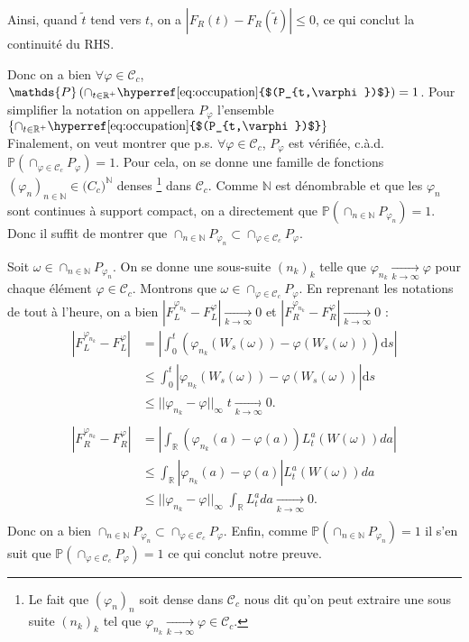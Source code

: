 \documentclass[openany]{book}
\makeatletter
\renewcommand{\P}{\mathds{P}}
\newcommand{\R}{\mathbb{R}}
\newcommand{\1}{\mathbbm{1}}
\newcommand{\refocc}{\hyperref[eq:occupation]{$(P_{t,\varphi})$}}
\renewcommand{\d}{\mathrm{d}}
\renewenvironment{proof}[1][\textbf{\textit{Démonstration}}]{%
  \par\pushQED{\qed}%
  \normalfont\topsep6\p@\@plus6\p@\relax
  \trivlist\item[\hskip\labelsep
    #1\@addpunct{.}]\ignorespaces
}{%
  \popQED\endtrivlist\@endpefalse
}
\theoremstyle{thmfont}
\theoremstyle{deffont}
\theoremstyle{thmfont}
\theoremstyle{deffont}
\makeatother
\begin{document}
\begin{proof}
\begin{itemize}
    Ainsi, quand $\tilde{t}$ tend vers $t$, on a $|F_R(t) - F_R(\tilde{t})| \leq 0$, ce qui conclut la continuité du RHS.
    \end{itemize}
    Donc on a bien $\forall \varphi \in \mathcal C_c$, $\P\left(\cap_{t\in \R^+} \text{\refocc}\right) = 1$. Pour simplifier la notation on appellera $P_\varphi$ l'ensemble $\left\{\cap_{t\in \R^+} \text{\refocc}\right\}$\\

    Finalement, on veut montrer que p.s. $\forall \varphi \in \mathcal C_c$, $P_\varphi$ est vérifiée, c.à.d. $\P(\cap_{\varphi \in \mathcal C_c} P_\varphi) = 1$. Pour cela, on se donne une famille de fonctions $(\varphi_n)_{n\in \mathbb N} \in \mathcal (C_c)^{\mathbb N}$ denses
 \footnote{Le fait que $(\varphi_n)_n$ soit dense dans $\mathcal C_c$ nous dit qu'on peut extraire une sous suite $(n_k)_k$ tel que $\varphi_{n_k} \xrightarrow[k \to \infty]{} \varphi \in \mathcal C_c$.}
 dans $\mathcal C_c$. Comme $\mathbb N$ est dénombrable et que les $\varphi_n$ sont continues à support compact, on a directement que $\P(\cap_{n\in \mathbb N}P_{\varphi_n})=1$. Donc il suffit de montrer que $\cap_{n\in \mathbb N} P_{\varphi_n} \subset \cap_{\varphi \in \mathcal C_c} P_\varphi$.

  Soit $\omega \in \cap_{n\in \mathbb N}P_{\varphi_n}$. On se donne une sous-suite $(n_k)_k$ telle que $\varphi_{n_k} \xrightarrow[k \to \infty]{} \varphi$ pour chaque élément $\varphi \in \mathcal C_c$. Montrons que $\omega \in \cap_{\varphi \in \mathcal C_c} P_\varphi$. En reprenant les notations de tout à l'heure, on a bien $|F_L^{\varphi_{n_k}} - F_L^\varphi|\xrightarrow[k \to \infty]{} 0$ et $|F_R^{\varphi_{n_k}} - F_R^\varphi|\xrightarrow[k \to \infty]{} 0$ :
%
\begin{align*}
  |F_L^{\varphi_{n_k}} - F_L^\varphi| &= \left|\int_0^t \left( \varphi_{n_k}(W_s(\omega)) - \varphi(W_s(\omega))\right)\d s\right|\\
                        &\leq \int_0^t \left| \varphi_{n_k}(W_s(\omega)) - \varphi(W_s(\omega))\right|\d s\\
                        &\leq ||\varphi_{n_k} - \varphi||_{\infty} \;t \xrightarrow[k \to \infty]{} 0.\\
  \\
  |F_R^{\varphi_{n_k}} - F_R^\varphi| &= \left|\int_\R \left( \varphi_{n_k}(a) - \varphi(a)\right) L_t^a(W(\omega)) da\right|\\
                          &\leq \int_\R |\varphi_{n_k}(a) - \varphi(a)| L_t^a(W(\omega)) da\\
                          &\leq ||\varphi_{n_k} - \varphi||_\infty \; \int_\R L_t^a da \xrightarrow[k\to \infty]{} 0.\\
\end{align*}
Donc on a bien $\cap_{n\in \mathbb N} P_{\varphi_n} \subset \cap_{\varphi \in \mathcal C_c} P_\varphi$. Enfin, comme $\P(\cap_{n\in \mathbb N} P_{\varphi_n}) = 1$ il s'en suit que $\P(\cap_{\varphi \in \mathcal C_c} P_\varphi) = 1$ ce qui conclut notre preuve.

  \end{proof}
\end{document}
